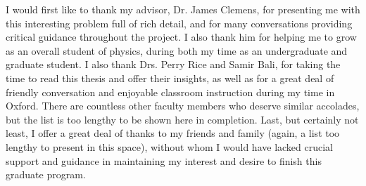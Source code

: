 \documentclass[a4paper, 11pt, oneside]{Thesis}
\begin{document}
\noindent I would first like to thank my advisor, Dr. James Clemens, for presenting me with this interesting problem full of rich detail, and for many conversations providing critical guidance throughout the project. I also thank him for helping me to grow as an overall student of physics, during both my time as an undergraduate and graduate student. I also thank Drs. Perry Rice and Samir Bali, for taking the time to read this thesis and offer their insights, as well as for a great deal of friendly conversation and enjoyable classroom instruction during my time in Oxford. There are countless other faculty members who deserve similar accolades, but the list is too lengthy to be shown here in completion. Last, but certainly not least, I offer a great deal of thanks to my friends and family (again, a list too lengthy to present in this space), without whom I would have lacked crucial support and guidance in maintaining my interest and desire to finish this graduate program.

\mainmatter







\appendix





\backmatter



\end{document}
